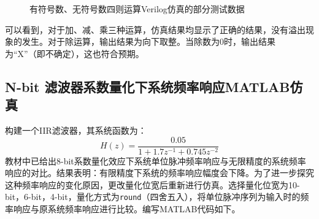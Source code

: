\documentclass[lang=cn,newtx,10pt,scheme=chinese]{elegantbook}
\begin{document}
\begin{figure}[htbp]
  \centering
  \newline
  \newline
  \newline
  \caption{有符号数、无符号数四则运算Verilog仿真的部分测试数据}
  \label{fig:verilog_test}
\end{figure}

可以看到，对于加、减、乘三种运算，仿真结果均显示了正确的结果，没有溢出现象的发生。对于除运算，输出结果为向下取整。当除数为0时，输出结果为“X”（即不确定），这也符合预期。  

\subsection{N-bit 滤波器系数量化下系统频率响应MATLAB仿真}
构建一个IIR滤波器，其系统函数为：
\begin{equation}
  H(z) = \frac{0.05}{1+1.7z^{-1}+0.745z^{-2}}
\end{equation}
教材中已给出8-bit系数量化效应下系统单位脉冲频率响应与无限精度的系统频率响应的对比。结果表明：有限精度下系统的频率响应幅度会下降。为了进一步探究这种频率响应的变化原因，更改量化位宽后重新进行仿真。选择量化位宽为10-bit，6-bit，4-bit，量化方式为\texttt{round}（四舍五入），将单位脉冲序列为输入时的频率响应与原系统频率响应进行比较。编写MATLAB代码如下。
\end{document}
